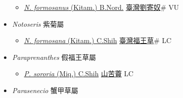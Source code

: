 \begin{itemize}
  \begin{itemize}
        \item[] \href{http://www.theplantlist.org/tpl1.1/search?q=Nemosenecio+formosanus}{\textit{N. formosanus} (Kitam.) B.Nord.}   \href{\detokenize{http://taibnet.sinica.edu.tw/chi/taibnet_species_list.php?T2=臺灣劉寄奴&T2_new_value=true&fr=y}}{臺灣劉寄奴}\# VU
  \end{itemize}
 \item[] \textit{Notoseris} 紫菊屬
                    
  \begin{itemize}
        \item[] \href{http://www.theplantlist.org/tpl1.1/search?q=Notoseris+formosana}{\textit{N. formosana} (Kitam.) C.Shih}   \href{\detokenize{http://taibnet.sinica.edu.tw/chi/taibnet_species_list.php?T2=臺灣福王草&T2_new_value=true&fr=y}}{臺灣福王草}\# LC
  \end{itemize}
 \item[] \textit{Paraprenanthes} 假福王草屬
                    
  \begin{itemize}
        \item[] \href{http://www.theplantlist.org/tpl1.1/search?q=Paraprenanthes+sororia}{\textit{P. sororia} (Miq.) C.Shih}   \href{\detokenize{http://taibnet.sinica.edu.tw/chi/taibnet_species_list.php?T2=山苦藚&T2_new_value=true&fr=y}}{山苦藚} LC
  \end{itemize}
 \item[] \textit{Parasenecio} 蟹甲草屬
                    

\end{itemize}
